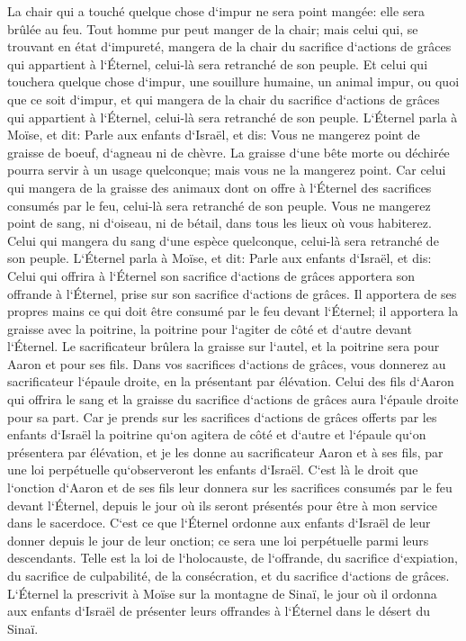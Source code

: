 \verse La chair qui a touché quelque chose d`impur ne sera point mangée: elle sera brûlée au feu. 
\verse Tout homme pur peut manger de la chair; mais celui qui, se trouvant en état d`impureté, mangera de la chair du sacrifice d`actions de grâces qui appartient à l`Éternel, celui-là sera retranché de son peuple. 
\verse Et celui qui touchera quelque chose d`impur, une souillure humaine, un animal impur, ou quoi que ce soit d`impur, et qui mangera de la chair du sacrifice d`actions de grâces qui appartient à l`Éternel, celui-là sera retranché de son peuple. 
\verse L`Éternel parla à Moïse, et dit: 
\verse Parle aux enfants d`Israël, et dis: Vous ne mangerez point de graisse de boeuf, d`agneau ni de chèvre. 
\verse La graisse d`une bête morte ou déchirée pourra servir à un usage quelconque; mais vous ne la mangerez point. 
\verse Car celui qui mangera de la graisse des animaux dont on offre à l`Éternel des sacrifices consumés par le feu, celui-là sera retranché de son peuple. 
\verse Vous ne mangerez point de sang, ni d`oiseau, ni de bétail, dans tous les lieux où vous habiterez. 
\verse Celui qui mangera du sang d`une espèce quelconque, celui-là sera retranché de son peuple. 
\verse L`Éternel parla à Moïse, et dit: 
\verse Parle aux enfants d`Israël, et dis: Celui qui offrira à l`Éternel son sacrifice d`actions de grâces apportera son offrande à l`Éternel, prise sur son sacrifice d`actions de grâces. 
\verse Il apportera de ses propres mains ce qui doit être consumé par le feu devant l`Éternel; il apportera la graisse avec la poitrine, la poitrine pour l`agiter de côté et d`autre devant l`Éternel. 
\verse Le sacrificateur brûlera la graisse sur l`autel, et la poitrine sera pour Aaron et pour ses fils. 
\verse Dans vos sacrifices d`actions de grâces, vous donnerez au sacrificateur l`épaule droite, en la présentant par élévation. 
\verse Celui des fils d`Aaron qui offrira le sang et la graisse du sacrifice d`actions de grâces aura l`épaule droite pour sa part. 
\verse Car je prends sur les sacrifices d`actions de grâces offerts par les enfants d`Israël la poitrine qu`on agitera de côté et d`autre et l`épaule qu`on présentera par élévation, et je les donne au sacrificateur Aaron et à ses fils, par une loi perpétuelle qu`observeront les enfants d`Israël. 
\verse C`est là le droit que l`onction d`Aaron et de ses fils leur donnera sur les sacrifices consumés par le feu devant l`Éternel, depuis le jour où ils seront présentés pour être à mon service dans le sacerdoce. 
\verse C`est ce que l`Éternel ordonne aux enfants d`Israël de leur donner depuis le jour de leur onction; ce sera une loi perpétuelle parmi leurs descendants. 
\verse Telle est la loi de l`holocauste, de l`offrande, du sacrifice d`expiation, du sacrifice de culpabilité, de la consécration, et du sacrifice d`actions de grâces. 
\verse L`Éternel la prescrivit à Moïse sur la montagne de Sinaï, le jour où il ordonna aux enfants d`Israël de présenter leurs offrandes à l`Éternel dans le désert du Sinaï. 

